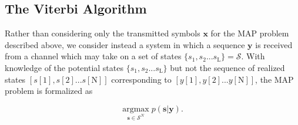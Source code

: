\subsection{The Viterbi Algorithm}
Rather than considering only the transmitted symbols $\mathbf{x}$ for the MAP problem described above, we consider instead a system in which a sequence $\mathbf{y}$ is received from a channel which may take on a set of states $\{s_1, s_2... s_{\text{L}}\} = \mathcal{S}$. With knowledge of the potential states $\{s_1, s_2... s_{\text{L}}\}$ but not the sequence of realized states $[s[1], s[2]... s[\text{N}]]$ corresponding to $[y[1], y[2]... y[\text{N}]]$, the MAP problem is formalized as

\begin{equation*}
\underset{\mathbf{s}\in\mathcal{S}^N}{\text{argmax}} \; p(\mathbf{s}|\mathbf{y}).
\end{equation*} 

